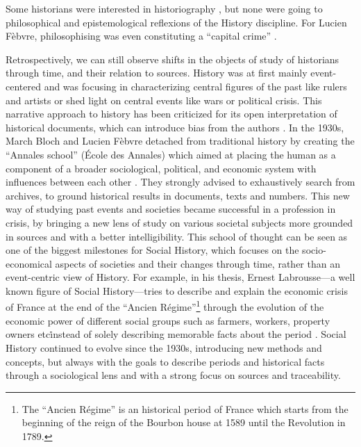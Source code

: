 Some historians were interested in historiography \cite{carbonellHistoriographie1981}, but none were going to philosophical and epistemological reflexions of the History discipline.
For Lucien Fèbvre, philosophising was even constituting a ``capital crime'' \cite{febvreVERSAUTREHISTOIRE1949, prost2014}.

Retrospectively, we can still observe shifts in the objects of study of historians through time, and their relation to sources.
History was at first mainly event-centered and was focusing in characterizing central figures of the past like rulers and artists or shed light on central events like wars or political crisis.
This narrative approach to history has been criticized for its open interpretation of historical documents, which can introduce bias from the authors \cite{bourdieuRapportsEntreSociologie1995}.
In the 1930s, March Bloch and Lucien Fèbvre detached from traditional history by creating the ``Annales school'' (\'Ecole des Annales) which aimed at placing the human as a component of a broader sociological, political, and economic system with influences between each other \cite{burkeHistorySocialTheory2005}.
They strongly advised to exhaustively search from archives, to ground historical results in documents, texts and numbers.
This new way of studying past events and societies became successful in a profession in crisis, by bringing a new lens of study on various societal subjects more grounded in sources and with a better intelligibility.
This school of thought can be seen as one of the biggest milestones for Social History, which focuses on the socio-economical aspects of societies and their changes through time, rather than an event-centric view of History.
For example, in his thesis, Ernest Labrousse---a well known figure of Social History---tries to describe and explain the economic crisis of France at the end of the ``Ancien Régime''\footnote{The ``Ancien Régime'' is an historical period of France which starts from the beginning of the reign of the Bourbon house at 1589 until the Revolution in 1789.} through the evolution of the economic power of different social groups such as farmers, workers, property owners etc\. instead of solely describing memorable facts about the period \cite{labrousse1990crise}.
Social History continued to evolve since the 1930s, introducing new methods and concepts, but always with the goals to describe periods and historical facts through a sociological lens and with a strong focus on sources and traceability.


